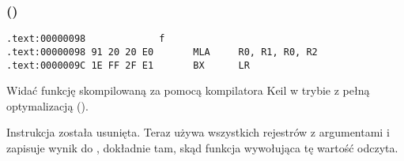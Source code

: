 ﻿\subsubsection{\OptimizingKeilVI (\ARMMode)}

\begin{lstlisting}[label=ARM_leaf_example1,style=customasmARM]
.text:00000098             f
.text:00000098 91 20 20 E0       MLA     R0, R1, R0, R2
.text:0000009C 1E FF 2F E1       BX      LR
\end{lstlisting}


Widać funkcję \ttf skompilowaną za pomocą kompilatora Keil w trybie z pełną optymalizacją (\Othree).

Instrukcja \MOV została usunięta. Teraz  używa wszystkich rejestrów z argumentami i zapisuje wynik do ,
dokładnie tam, skąd funkcja wywołująca tę wartość odczyta.
